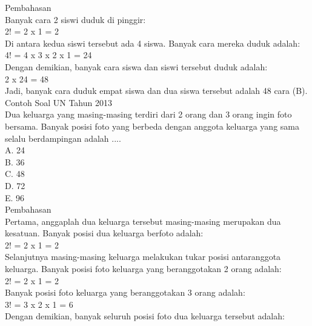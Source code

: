 \documentclass[11pt,fleqn]{book} %
\begin{document}
Pembahasan\\
Banyak cara 2 siswi duduk di pinggir:\\

2! = 2 x 1 = 2\\

Di antara kedua siswi tersebut ada 4 siswa. Banyak cara mereka duduk adalah:\\

4! = 4 x 3 x 2 x 1 = 24\\

Dengan demikian, banyak cara siswa dan siswi tersebut duduk adalah:\\

2 x 24 = 48\\

Jadi, banyak cara duduk empat siswa dan dua siswa tersebut adalah 48 cara (B).\\

Contoh Soal UN Tahun 2013\\
Dua keluarga yang masing-masing terdiri dari 2 orang dan 3 orang ingin foto bersama. Banyak posisi foto yang berbeda dengan anggota keluarga yang sama selalu berdampingan adalah ....\\

A.   24\\
B.   36\\
C.   48\\
D.   72\\
E.   96\\


Pembahasan\\
Pertama, anggaplah dua keluarga tersebut masing-masing merupakan dua kesatuan. Banyak posisi dua keluarga berfoto adalah:\\

2! = 2 x 1 = 2\\

Selanjutnya masing-masing keluarga melakukan tukar posisi antaranggota keluarga. Banyak posisi foto keluarga yang beranggotakan 2 orang adalah:\\

2! = 2 x 1 = 2\\

Banyak posisi foto keluarga yang beranggotakan 3 orang adalah:\\

3! = 3 x 2 x 1 = 6\\

Dengan demikian, banyak seluruh posisi foto dua keluarga tersebut adalah:\\
\end{document}
